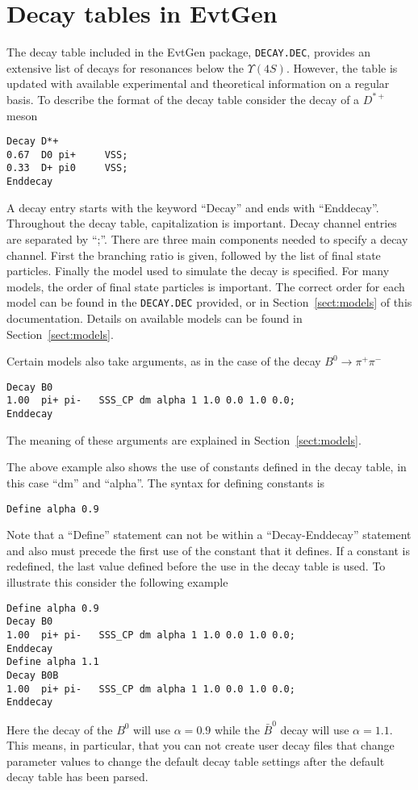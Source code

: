 \section{Decay tables in EvtGen}
\label{sect:decaytable}

The decay table included in the EvtGen package, 
{\tt DECAY.DEC}, provides an extensive
list of decays for resonances below the $\Upsilon(4S)$.
However, the table is updated with available experimental
and theoretical information on a regular basis.
To describe the format of the decay table 
consider the decay of a $D^{*+}$ meson
\begin{verbatim}
Decay D*+
0.67  D0 pi+     VSS;
0.33  D+ pi0     VSS;
Enddecay
\end{verbatim}
A decay entry starts with the keyword ``Decay'' and ends with
``Enddecay''.  Throughout the decay table, capitalization 
is important.  Decay channel entries are separated by ``;''. 
There are three main components needed to specify a
decay channel.  First the branching ratio is given,
followed by the list of final state particles.  Finally
the model used to simulate the decay is specified. For many 
models, the order of final state particles  is important.  The correct
order for each model can be found in the {\tt DECAY.DEC} provided,
or in Section~\ref{sect:models} of this documentation.  
Details on available models can be found in Section~\ref{sect:models}.  

Certain models also take arguments, as 
in the case of the decay $B^0\rightarrow \pi^+\pi^-$
\begin{verbatim}
Decay B0
1.00  pi+ pi-   SSS_CP dm alpha 1 1.0 0.0 1.0 0.0;
Enddecay
\end{verbatim}
The meaning of these arguments are explained
in Section~\ref{sect:models}.  

The above example also shows the use of constants 
defined in the decay table, in this case ``dm'' and ``alpha''.
The syntax for defining constants is
\begin{verbatim}
Define alpha 0.9
\end{verbatim}
Note that a ``Define'' statement can not be within 
a ``Decay-Enddecay'' statement and also must precede 
the first use of the constant that it defines.  
If a constant is redefined, the last value defined before the use in
the decay table is used. To illustrate this consider the following example
\begin{verbatim}
Define alpha 0.9
Decay B0
1.00  pi+ pi-   SSS_CP dm alpha 1 1.0 0.0 1.0 0.0;
Enddecay
Define alpha 1.1
Decay B0B
1.00  pi+ pi-   SSS_CP dm alpha 1 1.0 0.0 1.0 0.0;
Enddecay
\end{verbatim}
Here the decay of the $B^0$ will use $\alpha=0.9$ while the
$\bar B^0$ decay will use $\alpha=1.1$. This means, in particular,
that you can not create user decay files that change 
parameter values to change the default decay table settings after
the default decay table has been parsed.

